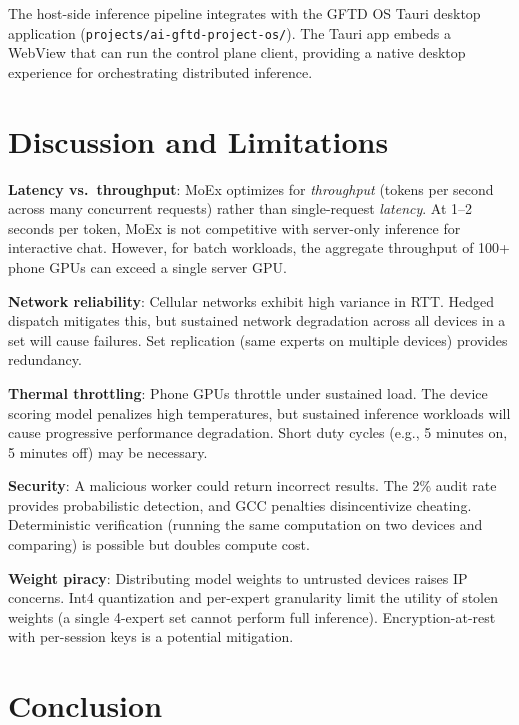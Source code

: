 \documentclass[11pt,a4paper]{article}
\begin{document}
The host-side inference pipeline integrates with the GFTD OS Tauri
desktop application (\texttt{projects/ai-gftd-project-os/}). The
Tauri app embeds a WebView that can run the control plane client,
providing a native desktop experience for orchestrating distributed
inference.

\section{Discussion and Limitations}
\label{sec:discussion}

\textbf{Latency vs.\ throughput}: MoEx optimizes for \emph{throughput}
(tokens per second across many concurrent requests) rather than
single-request \emph{latency}. At 1--2 seconds per token, MoEx is
not competitive with server-only inference for interactive chat.
However, for batch workloads, the aggregate throughput of 100+ phone
GPUs can exceed a single server GPU.

\textbf{Network reliability}: Cellular networks exhibit high variance
in RTT. Hedged dispatch mitigates this, but sustained network
degradation across all devices in a set will cause failures. Set
replication (same experts on multiple devices) provides redundancy.

\textbf{Thermal throttling}: Phone GPUs throttle under sustained load.
The device scoring model penalizes high temperatures, but sustained
inference workloads will cause progressive performance degradation.
Short duty cycles (e.g., 5 minutes on, 5 minutes off) may be
necessary.

\textbf{Security}: A malicious worker could return incorrect results.
The 2\% audit rate provides probabilistic detection, and GCC penalties
disincentivize cheating. Deterministic verification (running the same
computation on two devices and comparing) is possible but doubles
compute cost.

\textbf{Weight piracy}: Distributing model weights to untrusted devices
raises IP concerns. Int4 quantization and per-expert granularity
limit the utility of stolen weights (a single 4-expert set cannot
perform full inference). Encryption-at-rest with per-session keys
is a potential mitigation.

\section{Conclusion}
\label{sec:conclusion}
\end{document}
